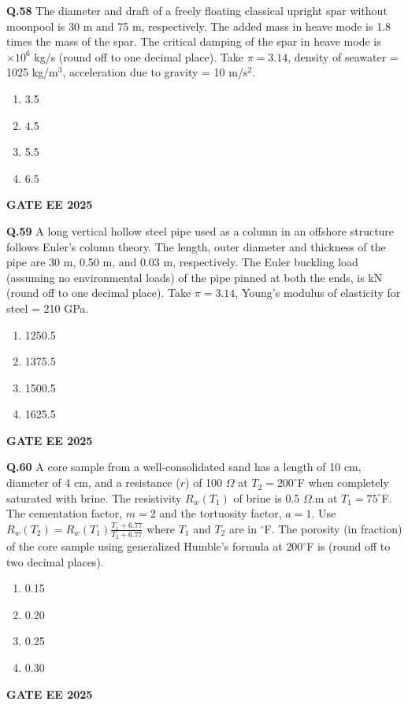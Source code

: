 \documentclass{article}
\begin{document}
\vspace{0.5cm}

\textbf{Q.58} The diameter and draft of a freely floating classical upright spar without moonpool is 30 m and 75 m, respectively. The added mass in heave mode is 1.8 times the mass of the spar. The critical damping of the spar in heave mode is \underline{\hspace{1cm}} $\times 10^6$ kg/s (round off to one decimal place). Take $\pi = 3.14$, density of seawater = 1025 kg/m$^3$, acceleration due to gravity = 10 m/s$^2$.
\begin{enumerate}[label=(\Alph*)]
    \item 3.5
    \item 4.5
    \item 5.5
    \item 6.5
\end{enumerate}
\textbf{GATE EE 2025}

\vspace{0.5cm}

\textbf{Q.59} A long vertical hollow steel pipe used as a column in an offshore structure follows Euler's column theory. The length, outer diameter and thickness of the pipe are 30 m, 0.50 m, and 0.03 m, respectively. The Euler buckling load (assuming no environmental loads) of the pipe pinned at both the ends, is \underline{\hspace{1cm}} kN (round off to one decimal place). Take $\pi = 3.14$, Young's modulus of elasticity for steel = 210 GPa.
\begin{enumerate}[label=(\Alph*)]
    \item 1250.5
    \item 1375.5
    \item 1500.5
    \item 1625.5
\end{enumerate}
\textbf{GATE EE 2025}

\vspace{0.5cm}

\textbf{Q.60} A core sample from a well-consolidated sand has a length of 10 cm, diameter of 4 cm, and a resistance ($r$) of 100 $\Omega$ at $T_2 = 200^\circ$F when completely saturated with brine. The resistivity $R_w(T_1)$ of brine is 0.5 $\Omega$.m at $T_1 = 75^\circ$F. The cementation factor, $m = 2$ and the tortuosity factor, $a = 1$. Use $R_w(T_2) = R_w(T_1) \frac{T_1 + 6.77}{T_2 + 6.77}$ where $T_1$ and $T_2$ are in $^\circ$F. The porosity (in fraction) of the core sample using generalized Humble's formula at $200^\circ$F is \underline{\hspace{1cm}} (round off to two decimal places).
\begin{enumerate}[label=(\Alph*)]
    \item 0.15
    \item 0.20
    \item 0.25
    \item 0.30
\end{enumerate}
\textbf{GATE EE 2025}
\end{document}
